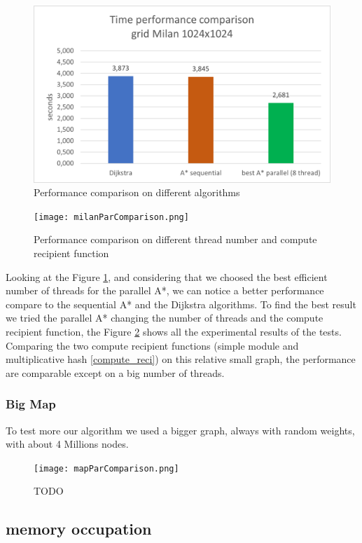 \begin{figure}
    \centering
    \includegraphics[scale=0.7]{../assets/milanComparison.png}
    \caption{Performance comparison on different algorithms}
    \label{Milan comp}
\end{figure}

\begin{figure}
    \centering
    \texttt{[image: milanParComparison.png]}
    \caption{Performance comparison on different thread number and compute recipient function}
    \label{Milan par comp}
\end{figure}


Looking at the Figure \ref{Milan comp}, and considering that we choosed the best efficient number of threads for the parallel A*, 
we can notice a better performance compare to the sequential A* and the Dijkstra algorithms. 
To find the best result we tried the parallel A* changing the number of threads and the compute recipient function,
the Figure \ref{Milan par comp} shows all the experimental results of the tests.
Comparing the two compute recipient functions (simple module and multiplicative hash \ref{compute_reci})
on this relative small graph, the performance are comparable except on a big number of threads.


\subsubsection{Big Map}

To test more our algorithm we used a bigger graph, always with random weights, with about 4 Millions nodes.

\begin{figure}
    \centering
    \texttt{[image: mapParComparison.png]}
    \caption{TODO}
\end{figure}






\subsection{memory occupation}
